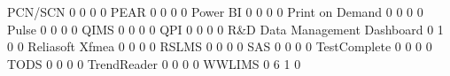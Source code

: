 \documentclass{article}
\begin{document}
\begin{Schunk}
\begin{Soutput}
  PCN/SCN                                                      0   0   0    0
  PEAR                                                         0   0   0    0
  Power BI                                                     0   0   0    0
  Print on Demand                                              0   0   0    0
  Pulse                                                        0   0   0    0
  QIMS                                                         0   0   0    0
  QPI                                                          0   0   0    0
  R&D Data Management Dashboard                                0   1   0    0
  Reliasoft Xfmea                                              0   0   0    0
  RSLMS                                                        0   0   0    0
  SAS                                                          0   0   0    0
  TestComplete                                                 0   0   0    0
  TODS                                                         0   0   0    0
  TrendReader                                                  0   0   0    0
  WWLIMS                                                       0   6   1    0
                                                           

\end{Soutput}
\end{Schunk}
\end{document}
